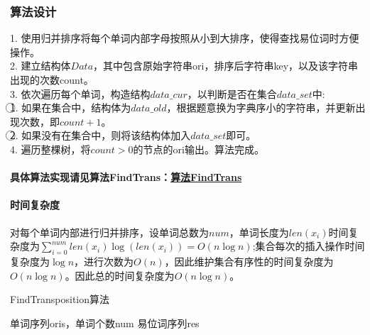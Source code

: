 \documentclass[11pt]{ctexart}
\begin{document}
	\subsubsection*{算法设计}
	1. 使用归并排序将每个单词内部字母按照从小到大排序，使得查找易位词时方便操作。\\
	\hspace*{20pt}2. 建立结构体$Data$，其中包含原始字符串ori，排序后字符串key，以及该字符串出现的次数count。\\
	\hspace*{20pt}3. 依次遍历每个单词，构造结构$data\_cur$，以判断是否在集合$data\_set$中:\\
	\hspace*{40pt}\textcircled{1}. 如果在集合中，结构体为$data\_old$，根据题意换为字典序小的字符串，并更新出现次数，即$count+1$。\\
	\hspace*{40pt}\textcircled{2}. 如果没有在集合中，则将该结构体加入$data\_set$即可。\\
	\hspace*{20pt}4. 遍历整棵树，将$count>0$的节点的ori输出。算法完成。\\
	\paragraph{具体算法实现请见算法FindTrans：\hyperref[FindTrans算法]{算法FindTrans}}
	\paragraph{时间复杂度}对每个单词内部进行归并排序，设单词总数为$num$，单词长度为$len(x_i)$时间复杂度为$\sum_{i=0}^{num}len(x_i)\log(len(x_i))=O(n\log n)$;集合每次的插入操作时间复杂度为$\log n$，进行次数为$O(n)$，因此维护集合有序性的时间复杂度为$O(n\log n)$。因此总的时间复杂度为$O(n\log n)$。\\
	\begin{algorithm}
		\setcounter{algorithm}{11}
		\caption{FindTransposition算法}
		\label{FindTrans算法}	
		\begin{algorithmic}[1]
		\Require 单词序列oris，单词个数num
		\Ensure  易位词序列res
		\Else
		\EndIf
		\EndFor
		\EndIf
		\EndFor
		\State {}
		\EndFunction
		\end{algorithmic}
	\end{algorithm}
\end{document}
